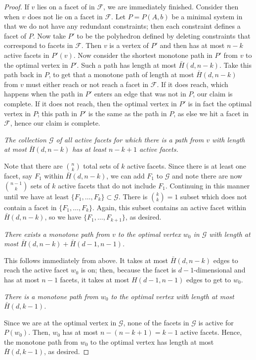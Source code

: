 \documentclass[11pt,a4paper]{article}
\theoremstyle{definition}
\begin{document}
\begin{proof}
If $v$ lies on a facet of in $\mathcal{F}$, we are immediately finished. Consider then when $v$ does not lie on a facet in $\mathcal{F}$. Let $P=P(A,b)$ be a minimal system in that we do not have any redundant constraints; then each constraint defines a facet of $P$. Now take $P'$ to be the polyhedron defined by deleting constraints that correspond to facets in $\mathcal{F}$. Then $v$ is a vertex of $P'$ and then has at most $n-k$ active facets in $P'(v)$. Now consider the shortest monotone path in $P'$ from $v$ to the optimal vertex in $P'$. Such a path has length at most $\bar{H}(d,n-k)$. Take this path back in $P$, to get that a monotone path of length at most $\bar{H}(d,n-k)$ from $v$ must either reach or not reach a facet in $\mathcal{F}$. If it does reach, which happens when the path in $P'$ enters an edge that was not in $P$, our claim is complete. If it does not reach, then the optimal vertex in $P'$ is in fact the optimal vertex in $P$; this path in $P'$ is the same as the path in $P$, as else we hit a facet in $\mathcal{F}$, hence our claim is complete.

\emph{The collection $\mathcal{G}$ of all active facets for which there is a path from $v$ with length at most $\bar{H}(d,n-k)$ has at least $n-k+1$ active facets.}

Note that there are ${n\choose k}$ total sets of $k$ active facets. Since there is at least one facet, say $F_1$ within $\bar{H}(d,n-k)$, we can add $F_1$ to $\mathcal{G}$ and note there are now ${n-1\choose k}$ sets of $k$ active facets that do not include $F_1$. Continuing in this manner until we have at least $\{F_1,\ldots,F_k\}\subset\mathcal{G}$. There is ${k \choose k}=1$ subset which does not contain a facet in $\{F_1,\ldots,F_k\}$. Again, this subset contains an active facet within $\bar{H}(d,n-k)$, so we have $\{F_1,\ldots,F_{k+1}\}$, as desired.

\emph{There exists a monotone path from $v$ to the optimal vertex $w_0$ in $\mathcal{G}$ with length at most $\bar{H}(d,n-k)+\bar{H}(d-1,n-1)$.}

This follows immediately from above. It takes at most $\bar{H}(d,n-k)$ edges to reach the active facet $w_0$ is on; then, because the facet is $d-1$-dimensional and has at most $n-1$ facets, it takes at most $H(d-1,n-1)$ edges to get to $w_0$.

\emph{There is a monotone path from $w_0$ to the optimal vertex with length at most $\bar{H}(d,k-1)$.}

Since we are at the optimal vertex in $\mathcal{G}$, none of the facets in $\mathcal{G}$ is active for $P(w_0)$. Then, $w_0$ has at most $n-(n-k+1)=k-1$ active facets. Hence, the monotone path from $w_0$ to the optimal vertex has length at most $\bar{H}(d,k-1)$, as desired.


\end{proof}
\end{document}
